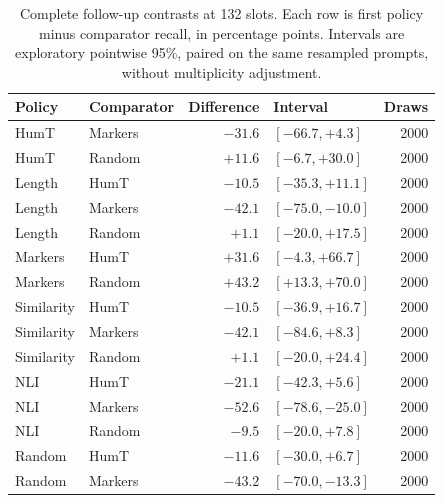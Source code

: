 \begin{table}[p]
\centering\footnotesize
\caption{Complete follow-up contrasts at 132 slots. Each row is first policy minus comparator recall, in percentage points. Intervals are exploratory pointwise 95\%, paired on the same resampled prompts, without multiplicity adjustment.}
\label{tab:semantic_followup_all}
\begin{tabular}{llrlr}
\toprule
Policy & Comparator & Difference & Interval & Draws \\
\midrule
HumT & Markers & $-31.6$ & $[-66.7, +4.3]$ & 2000 \\
HumT & Random & $+11.6$ & $[-6.7, +30.0]$ & 2000 \\
Length & HumT & $-10.5$ & $[-35.3, +11.1]$ & 2000 \\
Length & Markers & $-42.1$ & $[-75.0, -10.0]$ & 2000 \\
Length & Random & $+1.1$ & $[-20.0, +17.5]$ & 2000 \\
Markers & HumT & $+31.6$ & $[-4.3, +66.7]$ & 2000 \\
Markers & Random & $+43.2$ & $[+13.3, +70.0]$ & 2000 \\
Similarity & HumT & $-10.5$ & $[-36.9, +16.7]$ & 2000 \\
Similarity & Markers & $-42.1$ & $[-84.6, +8.3]$ & 2000 \\
Similarity & Random & $+1.1$ & $[-20.0, +24.4]$ & 2000 \\
NLI & HumT & $-21.1$ & $[-42.3, +5.6]$ & 2000 \\
NLI & Markers & $-52.6$ & $[-78.6, -25.0]$ & 2000 \\
NLI & Random & $-9.5$ & $[-20.0, +7.8]$ & 2000 \\
Random & HumT & $-11.6$ & $[-30.0, +6.7]$ & 2000 \\
Random & Markers & $-43.2$ & $[-70.0, -13.3]$ & 2000 \\
\bottomrule
\end{tabular}
\end{table}
